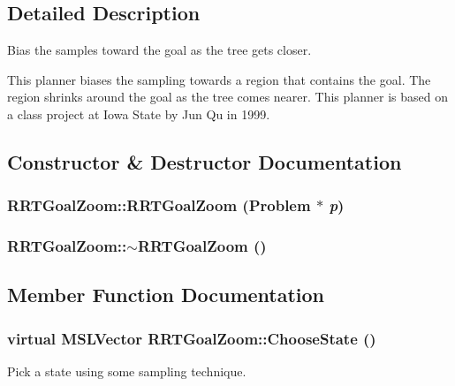 \subsection{Detailed Description}
Bias the samples toward the goal as the tree gets closer.

This planner biases the sampling towards a region that contains  the goal. The region shrinks around the goal as the tree comes nearer.  This planner is based on a class project at Iowa State by Jun Qu in 1999. 



\subsection{Constructor \& Destructor Documentation}
\subsubsection{\setlength{\rightskip}{0pt plus 5cm}RRTGoal\-Zoom::RRTGoal\-Zoom ({\bf Problem} $\ast$ {\em p})}\label{class_RRTGoalZoom_a0}


\subsubsection{\setlength{\rightskip}{0pt plus 5cm}RRTGoal\-Zoom::$\sim$RRTGoal\-Zoom ()\hspace{0.3cm}{\tt  [inline, virtual]}}\label{class_RRTGoalZoom_a1}




\subsection{Member Function Documentation}
\subsubsection{\setlength{\rightskip}{0pt plus 5cm}virtual {\bf MSLVector} RRTGoal\-Zoom::Choose\-State ()\hspace{0.3cm}{\tt  [protected, virtual]}}\label{class_RRTGoalZoom_b0}


Pick a state using some sampling technique.



